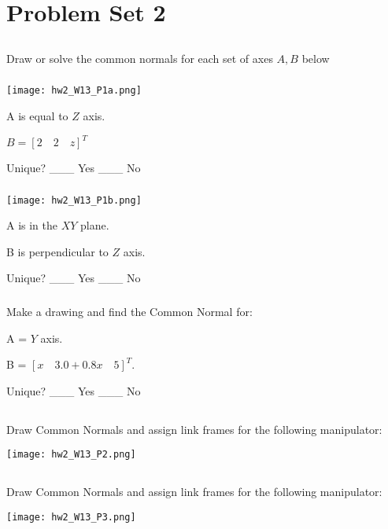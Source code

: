 \documentclass{article}
\begin{document}
\setcounter{section}{1}
\section{Problem Set 2}

\subsection{} 
Draw or solve the common normals for each set of axes $A,B$ below

\subsubsection{}

\texttt{[image: hw2\_W13\_P1a.png]}

A is equal to $Z$ axis.

$B = [2 \quad 2 \quad z]^T$

Unique?   \_\_\_ Yes  \_\_\_ No

\subsubsection{}

\texttt{[image: hw2\_W13\_P1b.png]}

A is in the $XY$ plane.

B is perpendicular to $Z$ axis. 

Unique?   \_\_\_ Yes  \_\_\_ No

\subsubsection{}

Make a drawing and find the Common Normal for:

A = $Y$ axis.

B = $[x \quad 3.0+0.8x \quad 5]^T$.

Unique?   \_\_\_ Yes  \_\_\_ No


\newpage
\subsection{}

Draw Common Normals and assign link frames for the following manipulator:

\texttt{[image: hw2\_W13\_P2.png]}

\subsection{}

Draw Common Normals and assign link frames for the following manipulator:

\texttt{[image: hw2\_W13\_P3.png]}
\end{document}
